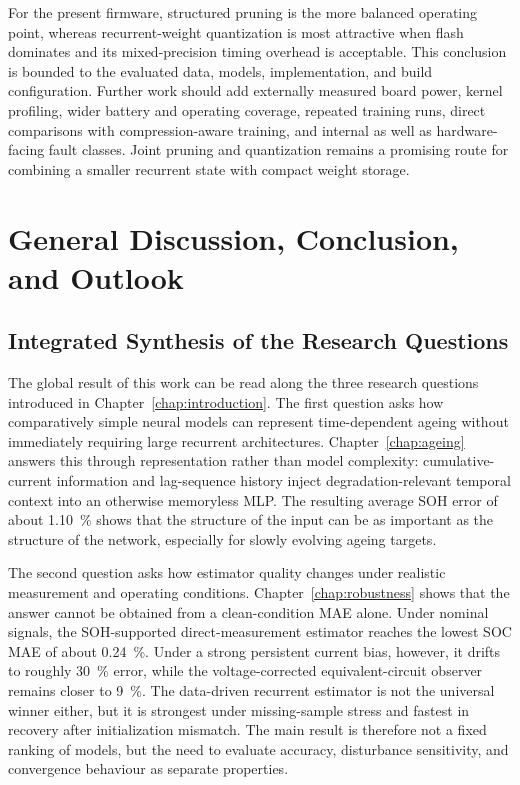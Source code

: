 \documentclass[
    a4paper,
    12pt,
    titlepage,
    bibliography=totoc,
    twoside=on,
    parskip=false,
    numbers=noenddot,
    cleardoublepage=empty,
    DIV=12,
    BCOR=12.0mm,
    headheight=36pt,
    headings=openright
]{scrreprt}
\begin{document}
For the present firmware, structured pruning is the more balanced operating point, whereas recurrent-weight quantization is most attractive when flash dominates and its mixed-precision timing overhead is acceptable. This conclusion is bounded to the evaluated data, models, implementation, and build configuration. Further work should add externally measured board power, kernel profiling, wider battery and operating coverage, repeated training runs, direct comparisons with compression-aware training, and internal as well as hardware-facing fault classes. Joint pruning and quantization remains a promising route for combining a smaller recurrent state with compact weight storage.
\chapter{General Discussion, Conclusion, and Outlook}
\label{chap:synthesis}
\section{Integrated Synthesis of the Research Questions}
The global result of this work can be read along the three research questions introduced in Chapter~\ref{chap:introduction}. The first question asks how comparatively simple neural models can represent time-dependent ageing without immediately requiring large recurrent architectures. Chapter~\ref{chap:ageing} answers this through representation rather than model complexity: cumulative-current information and lag-sequence history inject degradation-relevant temporal context into an otherwise memoryless MLP. The resulting average SOH error of about \SI{1.10}{\percent} shows that the structure of the input can be as important as the structure of the network, especially for slowly evolving ageing targets.

The second question asks how estimator quality changes under realistic measurement and operating conditions. Chapter~\ref{chap:robustness} shows that the answer cannot be obtained from a clean-condition MAE alone. Under nominal signals, the SOH-supported direct-measurement estimator reaches the lowest SOC MAE of about \SI{0.24}{\percent}. Under a strong persistent current bias, however, it drifts to roughly \SI{30}{\percent} error, while the voltage-corrected equivalent-circuit observer remains closer to \SI{9}{\percent}. The data-driven recurrent estimator is not the universal winner either, but it is strongest under missing-sample stress and fastest in recovery after initialization mismatch. The main result is therefore not a fixed ranking of models, but the need to evaluate accuracy, disturbance sensitivity, and convergence behaviour as separate properties.
\end{document}
